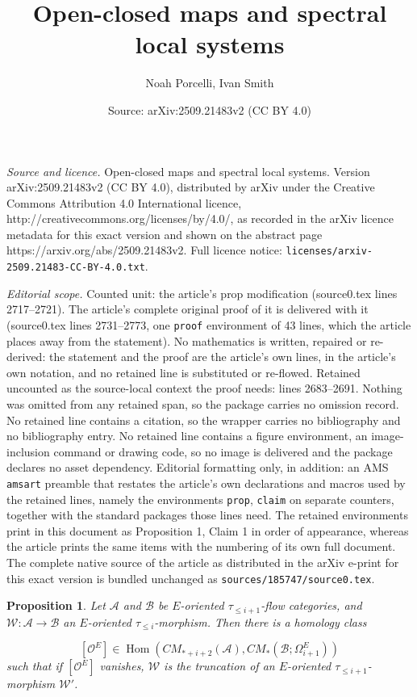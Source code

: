 \documentclass[10pt,a4paper]{amsart}
\title{Open-closed maps and spectral local systems}
\author{Noah Porcelli, Ivan Smith}
\date{Source: arXiv:2509.21483v2 (CC BY 4.0)}
\newtheorem{prop}{Proposition}
\newcommand{\cA}{\mathcal{A}}
\newcommand{\cB}{\mathcal{B}}
\newcommand{\cO}{\mathcal{O}}
\newcommand{\cW}{\mathcal{W}}
\begin{document}
\maketitle

\noindent\emph{Source and licence.} Open-closed maps and spectral local systems. Version arXiv:2509.21483v2 (CC BY 4.0), distributed by arXiv under the Creative Commons Attribution 4.0 International licence, http://creativecommons.org/licenses/by/4.0/, as recorded in the arXiv licence metadata for this exact version and shown on the abstract page https://arxiv.org/abs/2509.21483v2. Full licence notice: \texttt{licenses/arxiv-2509.21483-CC-BY-4.0.txt}.\par\smallskip

\noindent\textit{Editorial scope.} Counted unit: the article's prop modification (source0.tex lines 2717--2721). The article's complete original proof of it is delivered with it (source0.tex lines 2731--2773, one \texttt{proof} environment of 43 lines, which the article places away from the statement). No mathematics is written, repaired or re-derived: the statement and the proof are the article's own lines, in the article's own notation, and no retained line is substituted or re-flowed.  Retained uncounted as the source-local context the proof needs: lines 2683--2691.  Nothing was omitted from any retained span, so the package carries no omission record.  No retained line contains a citation, so the wrapper carries no bibliography and no bibliography entry.  No retained line contains a figure environment, an image-inclusion command or drawing code, so no image is delivered and the package declares no asset dependency.  Editorial formatting only, in addition: an AMS \texttt{amsart} preamble that restates the article's own declarations and macros used by the retained lines, namely the environments \texttt{prop}, \texttt{claim} on separate counters, together with the standard packages those lines need.  The retained environments print in this document as Proposition 1, Claim 1 in order of appearance, whereas the article prints the same items with the numbering of its own full document.  The complete native source of the article as distributed in the arXiv e-print for this exact version is bundled unchanged as \texttt{sources/185747/source0.tex}.
    \begin{prop}\label{prop: lift ob}
        Let $\cA$ and $\cB$ be $E$-oriented $\tau_{\leq i+1}$-flow categories, and $\cW: \cA \to \cB$ an $E$-oriented $\tau_{\leq i}$-morphism. Then there is a homology class

        \begin{equation}\label{eq: lift ob}
            [\cO^E] \in \operatorname{Hom}\left(CM_{*+i+2}(\cA), CM_*(\cB; \Omega^{E}_{i+1})\right)
        \end{equation}
        such that if $[\cO^E]$ vanishes, $\cW$ is the truncation of an $E$-oriented $\tau_{\leq i+1}$-morphism $\cW'$.
    
    \end{prop}
\end{document}
